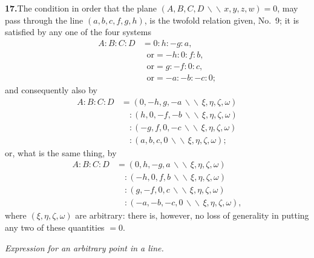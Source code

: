 \documentclass[11pt,a4paper]{article}
\begin{document}
\textbf{17.}\quad The condition in order that the plane
$(A, B, C, D \,\backslash\!\!\backslash\, x, y, z, w) = 0$, may pass through the line
$(a, b, c, f, g, h)$, is the twofold relation given, No.~9; it is satisfied by
any one of the four systems
\begin{align*}
A : B : C : D &= 0 : h : -g : a, \\
              &\;\;\text{or} = -h : 0 : f : b, \\
              &\;\;\text{or} = g : -f : 0 : c, \\
              &\;\;\text{or} = -a : -b : -c : 0;
\end{align*}
and consequently also by
\begin{align*}
A : B : C : D
   &= (0, -h, g, -a \,\backslash\!\!\backslash\, \xi, \eta, \zeta, \omega) \\
   &\quad : (h, 0, -f, -b \,\backslash\!\!\backslash\, \xi, \eta, \zeta, \omega) \\
   &\quad : (-g, f, 0, -c \,\backslash\!\!\backslash\, \xi, \eta, \zeta, \omega) \\
   &\quad : (a, b, c, 0 \,\backslash\!\!\backslash\, \xi, \eta, \zeta, \omega);
\end{align*}
or, what is the same thing, by
\begin{align*}
A : B : C : D
   &= (0, h, -g, a \,\backslash\!\!\backslash\, \xi, \eta, \zeta, \omega) \\
   &\quad : (-h, 0, f, b \,\backslash\!\!\backslash\, \xi, \eta, \zeta, \omega) \\
   &\quad : (g, -f, 0, c \,\backslash\!\!\backslash\, \xi, \eta, \zeta, \omega) \\
   &\quad : (-a, -b, -c, 0 \,\backslash\!\!\backslash\, \xi, \eta, \zeta, \omega),
\end{align*}
where $(\xi, \eta, \zeta, \omega)$ are arbitrary: there is, however, no loss
of generality in putting any two of these quantities $= 0$.

\medskip
\noindent\textit{Expression for an arbitrary point in a line.}
\medskip
\end{document}
